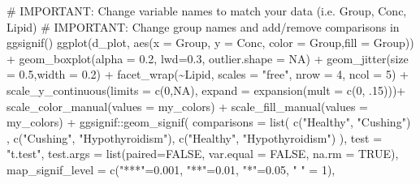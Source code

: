 \documentclass[
  letterpaper,
  DIV=11,
  numbers=noendperiod]{scrreprt}
\newenvironment{Shaded}{\begin{snugshade}}{\end{snugshade}}
\newcommand{\AttributeTok}[1]{\textcolor[rgb]{0.40,0.45,0.13}{#1}}
\newcommand{\CommentTok}[1]{\textcolor[rgb]{0.37,0.37,0.37}{#1}}
\newcommand{\ConstantTok}[1]{\textcolor[rgb]{0.56,0.35,0.01}{#1}}
\newcommand{\DecValTok}[1]{\textcolor[rgb]{0.68,0.00,0.00}{#1}}
\newcommand{\FloatTok}[1]{\textcolor[rgb]{0.68,0.00,0.00}{#1}}
\newcommand{\FunctionTok}[1]{\textcolor[rgb]{0.28,0.35,0.67}{#1}}
\newcommand{\NormalTok}[1]{\textcolor[rgb]{0.00,0.23,0.31}{#1}}
\newcommand{\OtherTok}[1]{\textcolor[rgb]{0.00,0.23,0.31}{#1}}
\newcommand{\SpecialCharTok}[1]{\textcolor[rgb]{0.37,0.37,0.37}{#1}}
\newcommand{\StringTok}[1]{\textcolor[rgb]{0.13,0.47,0.30}{#1}}
\begin{document}
\begin{Shaded}
\begin{Highlighting}[]
\CommentTok{\# IMPORTANT: Change variable names to match your data (i.e. Group, Conc, Lipid)}
\CommentTok{\# IMPORTANT: Change group names and add/remove comparisons in \textasciigrave{}ggsignif()\textasciigrave{}}
\FunctionTok{ggplot}\NormalTok{(d\_plot, }\FunctionTok{aes}\NormalTok{(}\AttributeTok{x =}\NormalTok{ Group, }\AttributeTok{y =}\NormalTok{ Conc, }\AttributeTok{color =}\NormalTok{ Group,}\AttributeTok{fill =}\NormalTok{ Group)) }\SpecialCharTok{+} 
  \FunctionTok{geom\_boxplot}\NormalTok{(}\AttributeTok{alpha =} \FloatTok{0.2}\NormalTok{, }\AttributeTok{lwd=}\FloatTok{0.3}\NormalTok{, }\AttributeTok{outlier.shape =} \ConstantTok{NA}\NormalTok{) }\SpecialCharTok{+}
  \FunctionTok{geom\_jitter}\NormalTok{(}\AttributeTok{size =} \FloatTok{0.5}\NormalTok{,}\AttributeTok{width =} \FloatTok{0.2}\NormalTok{) }\SpecialCharTok{+}
  \FunctionTok{facet\_wrap}\NormalTok{(}\SpecialCharTok{\textasciitilde{}}\NormalTok{Lipid, }\AttributeTok{scales =} \StringTok{"free"}\NormalTok{, }\AttributeTok{nrow =} \DecValTok{4}\NormalTok{, }\AttributeTok{ncol =} \DecValTok{5}\NormalTok{) }\SpecialCharTok{+} 
  \FunctionTok{scale\_y\_continuous}\NormalTok{(}\AttributeTok{limits =} \FunctionTok{c}\NormalTok{(}\DecValTok{0}\NormalTok{,}\ConstantTok{NA}\NormalTok{), }\AttributeTok{expand =} \FunctionTok{expansion}\NormalTok{(}\AttributeTok{mult =} \FunctionTok{c}\NormalTok{(}\DecValTok{0}\NormalTok{, .}\DecValTok{15}\NormalTok{)))}\SpecialCharTok{+}
  \FunctionTok{scale\_color\_manual}\NormalTok{(}\AttributeTok{values =}\NormalTok{ my\_colors) }\SpecialCharTok{+}
  \FunctionTok{scale\_fill\_manual}\NormalTok{(}\AttributeTok{values =}\NormalTok{ my\_colors) }\SpecialCharTok{+}
\NormalTok{  ggsignif}\SpecialCharTok{::}\FunctionTok{geom\_signif}\NormalTok{(}
    \AttributeTok{comparisons =} \FunctionTok{list}\NormalTok{(}
      \FunctionTok{c}\NormalTok{(}\StringTok{"Healthy"}\NormalTok{, }\StringTok{"Cushing"}\NormalTok{) ,}
      \FunctionTok{c}\NormalTok{(}\StringTok{"Cushing"}\NormalTok{, }\StringTok{"Hypothyroidism"}\NormalTok{), }
      \FunctionTok{c}\NormalTok{(}\StringTok{"Healthy"}\NormalTok{, }\StringTok{"Hypothyroidism"}\NormalTok{)}
\NormalTok{    ), }
    \AttributeTok{test =} \StringTok{"t.test"}\NormalTok{, }
    \AttributeTok{test.args =} \FunctionTok{list}\NormalTok{(}\AttributeTok{paired=}\ConstantTok{FALSE}\NormalTok{, }\AttributeTok{var.equal =} \ConstantTok{FALSE}\NormalTok{, }\AttributeTok{na.rm =} \ConstantTok{TRUE}\NormalTok{), }
    \AttributeTok{map\_signif\_level =} \FunctionTok{c}\NormalTok{(}\StringTok{"***"}\OtherTok{=}\FloatTok{0.001}\NormalTok{, }\StringTok{"**"}\OtherTok{=}\FloatTok{0.01}\NormalTok{, }\StringTok{"*"}\OtherTok{=}\FloatTok{0.05}\NormalTok{, }\StringTok{" "} \OtherTok{=} \DecValTok{1}\NormalTok{),}

\end{Highlighting}
\end{Shaded}
\end{document}
